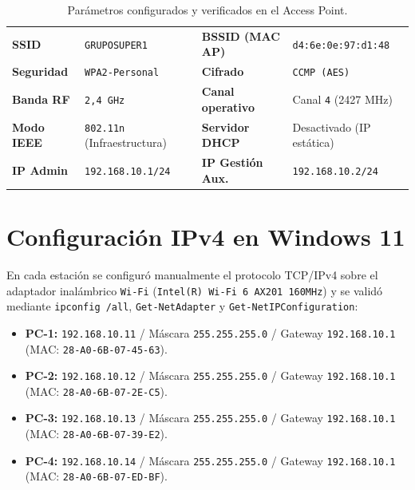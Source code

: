 \documentclass[11pt, a4paper]{article}
\begin{document}
\begin{table}[h!]
\centering
\small
\setlength{\tabcolsep}{5pt}
\caption{Parámetros configurados y verificados en el Access Point.}
\begin{tabularx}{\textwidth}{>{\bfseries}l X >{\bfseries}l X}
\toprule
SSID & \texttt{GRUPOSUPER1} & BSSID (MAC AP) & \texttt{d4:6e:0e:97:d1:48} \\
Seguridad & \texttt{WPA2-Personal} & Cifrado & \texttt{CCMP (AES)} \\
Banda RF & \texttt{2,4 GHz} & Canal operativo & Canal \texttt{4} (2427 MHz) \\
Modo IEEE & \texttt{802.11n} (Infraestructura) & Servidor DHCP & Desactivado (IP estática) \\
IP Admin & \texttt{192.168.10.1/24} & IP Gestión Aux. & \texttt{192.168.10.2/24} \\
\bottomrule
\end{tabularx}
\end{table}

\section{Configuración IPv4 en Windows 11}

En cada estación se configuró manualmente el protocolo TCP/IPv4 sobre el adaptador inalámbrico \texttt{Wi-Fi} (\texttt{Intel(R) Wi-Fi 6 AX201 160MHz}) y se validó mediante \texttt{ipconfig /all}, \texttt{Get-NetAdapter} y \texttt{Get-NetIPConfiguration}:

\begin{itemize}
    \item \textbf{PC-1:} \texttt{192.168.10.11} / Máscara \texttt{255.255.255.0} / Gateway \texttt{192.168.10.1} (MAC: \texttt{28-A0-6B-07-45-63}).
    \item \textbf{PC-2:} \texttt{192.168.10.12} / Máscara \texttt{255.255.255.0} / Gateway \texttt{192.168.10.1} (MAC: \texttt{28-A0-6B-07-2E-C5}).
    \item \textbf{PC-3:} \texttt{192.168.10.13} / Máscara \texttt{255.255.255.0} / Gateway \texttt{192.168.10.1} (MAC: \texttt{28-A0-6B-07-39-E2}).
    \item \textbf{PC-4:} \texttt{192.168.10.14} / Máscara \texttt{255.255.255.0} / Gateway \texttt{192.168.10.1} (MAC: \texttt{28-A0-6B-07-ED-BF}).
\end{itemize}
\end{document}
